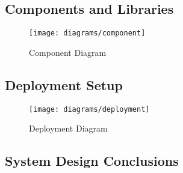 \subsection{Components and Libraries}

\begin{figure}[!h]
\centering
\texttt{[image: diagrams/component]}
\caption{Component Diagram}\label{diag:component}
\end{figure}

\subsection{Deployment Setup}

\begin{figure}[!h]
\centering
\texttt{[image: diagrams/deployment]}
\caption{Deployment Diagram}\label{diag:deployment}
\end{figure}

\subsection{System Design Conclusions}

\clearpage

